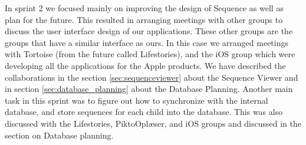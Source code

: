In sprint 2 we focused mainly on improving the design of Sequence as well as plan for the future. 
This resulted in arranging meetings with other groups to discuss the user interface design of our applications. These other groups are the groups that have a similar interface as ours. In this case we arranged meetings with Tortoise (from the future called Lifestories), and the iOS group which were developing all the applications for the Apple products. We have described the collaborations in the section \ref{sec:sequenceviewer} about the Sequence Viewer and in section \ref{sec:database_planning} about the Database Planning. Another main task in this sprint was to figure out how to synchronize with the internal database, and store sequences for each child into the database. This was also discussed with the Lifestories, PiktoOplæser, and iOS groups and discussed in the section on Database planning.

